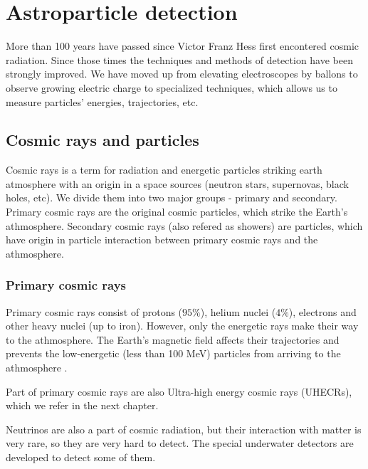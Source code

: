 
\chapter{Astroparticle detection}
More than 100 years have passed since Victor Franz Hess first encontered cosmic radiation. Since those times the techniques and methods of detection have been strongly improved. We have moved up from elevating electroscopes by ballons to observe growing electric charge to specialized techniques, which allows us to measure particles' energies, trajectories, etc.

\section{Cosmic rays and particles}
Cosmic rays is a term for radiation and energetic particles striking earth atmosphere with an origin in a space sources (neutron stars, supernovas, black holes, etc). We divide them into two major groups - primary and secondary. Primary cosmic rays are the original cosmic particles, which strike the Earth's athmosphere. Secondary cosmic rays (also refered as showers) are particles, which have origin in particle interaction between primary cosmic rays and the athmosphere.
\par
\subsection{Primary cosmic rays}
Primary cosmic rays consist of protons ($95 \%$), helium nuclei ($4 \%$), electrons and other heavy nuclei (up to iron). However, only the energetic rays make their way to the athmosphere. The Earth's magnetic field affects their trajectories and prevents the low-energetic (less than 100 MeV) particles from arriving to the athmosphere \cite{Kliewer}. 
\par
Part of primary cosmic rays are also Ultra-high energy cosmic rays (UHECRs), which we refer in the next chapter.
\par 
Neutrinos are also a part of cosmic radiation, but their interaction with matter is very rare, so they are very hard to detect. The special underwater detectors are developed to detect some of them. 
